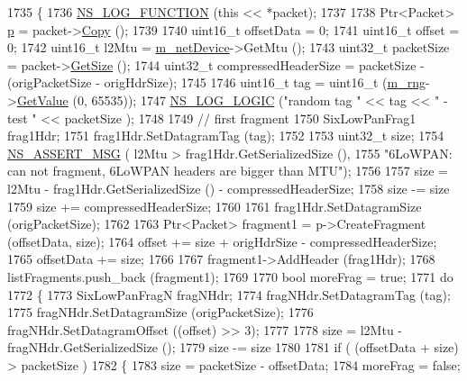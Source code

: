 \begin{DoxyCode}
1735 \{
1736   \hyperlink{log-macros-disabled_8h_a90b90d5bad1f39cb1b64923ea94c0761}{NS\_LOG\_FUNCTION} (\textcolor{keyword}{this} << *packet);
1737 
1738   Ptr<Packet> \hyperlink{lte__link__budget_8m_ac9de518908a968428863f829398a4e62}{p} = packet->\hyperlink{classns3_1_1Packet_a5d5c70802a5f77fc5f0001e0cfc1898b}{Copy} ();
1739 
1740   uint16\_t offsetData = 0;
1741   uint16\_t offset = 0;
1742   uint16\_t l2Mtu = \hyperlink{classns3_1_1SixLowPanNetDevice_a758b615a8b8f811ae3517ab9c7574f7b}{m\_netDevice}->GetMtu ();
1743   uint32\_t packetSize = packet->\hyperlink{classns3_1_1Packet_a462855c9929954d4301a4edfe55f4f1c}{GetSize} ();
1744   uint32\_t compressedHeaderSize = packetSize - (origPacketSize - origHdrSize);
1745 
1746   uint16\_t tag = uint16\_t (\hyperlink{classns3_1_1SixLowPanNetDevice_a2790a5f0228097a1e52b728dcdbf70d2}{m\_rng}->\hyperlink{classns3_1_1UniformRandomVariable_a03822d8c86ac51e9aa83bbc73041386b}{GetValue} (0, 65535));
1747   \hyperlink{group__logging_ga88acd260151caf2db9c0fc84997f45ce}{NS\_LOG\_LOGIC} (\textcolor{stringliteral}{"random tag "} << tag << \textcolor{stringliteral}{" - test "} << packetSize );
1748 
1749   \textcolor{comment}{// first fragment}
1750   SixLowPanFrag1 frag1Hdr;
1751   frag1Hdr.SetDatagramTag (tag);
1752 
1753   uint32\_t size;
1754   \hyperlink{assert_8h_aff5ece9066c74e681e74999856f08539}{NS\_ASSERT\_MSG} ( l2Mtu > frag1Hdr.GetSerializedSize (),
1755                   \textcolor{stringliteral}{"6LoWPAN: can not fragment, 6LoWPAN headers are bigger than MTU"});
1756 
1757   size = l2Mtu - frag1Hdr.GetSerializedSize () - compressedHeaderSize;
1758   size -= size %
1759   size += compressedHeaderSize;
1760 
1761   frag1Hdr.SetDatagramSize (origPacketSize);
1762 
1763   Ptr<Packet> fragment1 = p->CreateFragment (offsetData, size);
1764   offset += size + origHdrSize - compressedHeaderSize;
1765   offsetData += size;
1766 
1767   fragment1->AddHeader (frag1Hdr);
1768   listFragments.push\_back (fragment1);
1769 
1770   \textcolor{keywordtype}{bool} moreFrag = \textcolor{keyword}{true};
1771   \textcolor{keywordflow}{do}
1772     \{
1773       SixLowPanFragN fragNHdr;
1774       fragNHdr.SetDatagramTag (tag);
1775       fragNHdr.SetDatagramSize (origPacketSize);
1776       fragNHdr.SetDatagramOffset ((offset) >> 3);
1777 
1778       size = l2Mtu - fragNHdr.GetSerializedSize ();
1779       size -= size %
1780 
1781       \textcolor{keywordflow}{if} ( (offsetData + size) > packetSize )
1782         \{
1783           size = packetSize - offsetData;
1784           moreFrag = \textcolor{keyword}{false};

\end{DoxyCode}

